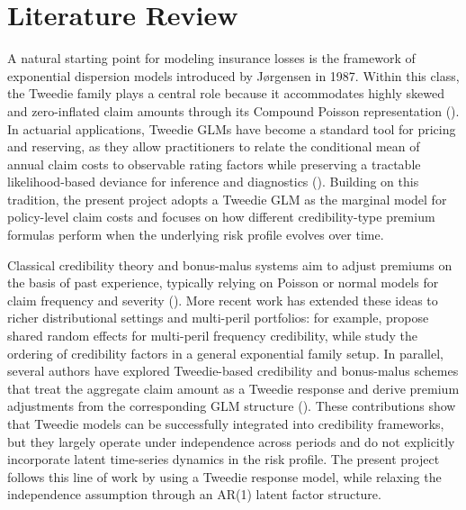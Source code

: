 \documentclass{sfuthesis}
\numberwithin{equation}{chapter}
\begin{document}
\section{Literature Review}

A natural starting point for modeling insurance losses is the framework of exponential dispersion models introduced by J{\o}rgensen in 1987. Within this class, the Tweedie family plays a central role because it accommodates highly skewed and zero-inflated claim amounts through its Compound Poisson representation (\cite{jorgensen1994fitting,smyth2002fitting}). In actuarial applications, Tweedie GLMs have become a standard tool for pricing and reserving, as they allow practitioners to relate the conditional mean of annual claim costs to observable rating factors while preserving a tractable likelihood-based deviance for inference and diagnostics (\cite{klugman2019}). Building on this tradition, the present project adopts a Tweedie GLM as the marginal model for policy-level claim costs and focuses on how different credibility-type premium formulas perform when the underlying risk profile evolves over time.

Classical credibility theory and bonus-malus systems aim to adjust premiums on the basis of past experience, typically relying on Poisson or normal models for claim frequency and severity (\cite{buhlmann2005course,jewell1974credible}). More recent work has extended these ideas to richer distributional settings and multi-peril portfolios: for example,  \cite{jeong2023multi} propose shared random effects for multi-peril frequency credibility, while \cite{ahn2021ordering} study the ordering of credibility factors in a general exponential family setup. In parallel, several authors have explored Tweedie-based credibility and bonus-malus schemes that treat the aggregate claim amount as a Tweedie response and derive premium adjustments from the corresponding GLM structure (\cite{ohlsson2006exact,frangos2001design,jeong2024tweedie}). These contributions show that Tweedie models can be successfully integrated into credibility frameworks, but they largely operate under independence across periods and do not explicitly incorporate latent time-series dynamics in the risk profile. The present project follows this line of work by using a Tweedie response model, while relaxing the independence assumption through an AR(1) latent factor structure.
\end{document}
